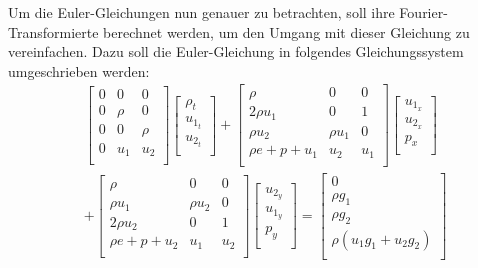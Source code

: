 Um die Euler-Gleichungen nun genauer zu betrachten, soll ihre Fourier-Transformierte berechnet werden, um den Umgang mit dieser Gleichung zu vereinfachen.
Dazu soll die Euler-Gleichung in folgendes Gleichungssystem umgeschrieben werden:
\begin{align}
\label{eq:euler_system}
    &\begin{bmatrix}
        0 & 0 & 0 \\
        0 & \rho  & 0 \\
        0 & 0 & \rho \\
        0 & u_1   & u_2 \\
    \end{bmatrix}
    \begin{bmatrix}
        \rho_t \\
        u_{1_t} \\
        u_{2_t} \\
    \end{bmatrix}
    +
    \begin{bmatrix}
        \rho & 0 & 0 \\
        2\rho u_1 & 0 & 1 \\
        \rho u_2 & \rho u_1 & 0 \\
        \rho e + p + u_1 & u_2 & u_1 \\
    \end{bmatrix}
    \begin{bmatrix}
        u_{1_x} \\
        u_{2_x} \\
        p_x \\
    \end{bmatrix} \\
    &+
    \begin{bmatrix}
    \rho             & 0 & 0 \\
    \rho u_1         & \rho u_2 & 0 \\
    2\rho u_2        & 0 & 1 \\
    \rho e + p + u_2 & u_1 & u_2 \\
    \end{bmatrix}
    \begin{bmatrix}
        u_{2_y} \\
        u_{1_y} \\
        p_y \\
    \end{bmatrix}
    =
    \begin{bmatrix}
        0 \\
        \rho g_1 \\
        \rho g_2 \\
        \rho (u_1 g_1 + u_2 g_2)\\
    \end{bmatrix}
\end{align}
